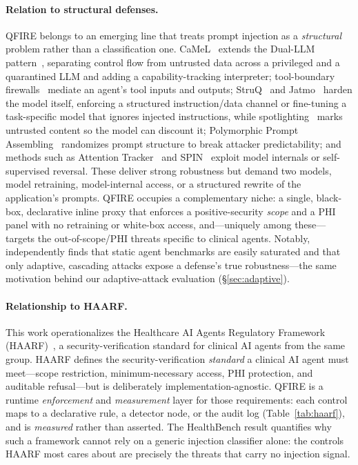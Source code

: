 \documentclass[11pt]{article}
\begin{document}
\paragraph{Relation to structural defenses.}
QFIRE belongs to an emerging line that treats prompt injection as a \emph{structural}
problem rather than a classification one. CaMeL~\cite{camel2025} extends the Dual-LLM
pattern~\cite{willison2023}, separating control flow from untrusted data across a
privileged and a quarantined LLM and adding a capability-tracking interpreter;
tool-boundary firewalls~\cite{firewallsbench2026} mediate an agent's tool inputs and
outputs; StruQ~\cite{struq2024} and Jatmo~\cite{jatmo2023} harden the model itself,
enforcing a structured instruction/data channel or fine-tuning a task-specific model
that ignores injected instructions, while spotlighting~\cite{spotlighting2024} marks
untrusted content so the model can discount it; Polymorphic Prompt
Assembling~\cite{ppa2025} randomizes prompt structure to break attacker
predictability; and methods such as Attention Tracker~\cite{attentiontracker2025} and
SPIN~\cite{spin2024} exploit model internals or self-supervised reversal. These deliver
strong robustness but demand two models, model retraining, model-internal access, or a
structured rewrite of the application's prompts. QFIRE occupies a complementary niche: a single,
black-box, declarative inline proxy that enforces a positive-security \emph{scope} and a
PHI panel with no retraining or white-box access, and---uniquely among these---targets
the out-of-scope/PHI threats specific to clinical agents. Notably,
\cite{firewallsbench2026} independently finds that static agent benchmarks are easily
saturated and that only adaptive, cascading attacks expose a defense's true
robustness---the same motivation behind our adaptive-attack evaluation
(\S\ref{sec:adaptive}).

\paragraph{Relationship to HAARF.}
This work operationalizes the Healthcare AI Agents Regulatory Framework
(HAARF)~\cite{schwoebel2026haarf}, a security-verification standard for clinical AI agents
from the same group. HAARF defines the security-verification \emph{standard}
a clinical AI agent must meet---scope restriction, minimum-necessary access, PHI
protection, and auditable refusal---but is deliberately implementation-agnostic.
QFIRE is a runtime \emph{enforcement} and \emph{measurement} layer for those
requirements: each control maps to a declarative rule, a detector node, or the
audit log (Table~\ref{tab:haarf}), and is \emph{measured} rather than asserted. The
HealthBench result quantifies why such a framework cannot rely on a generic
injection classifier alone: the controls HAARF most cares about are precisely the
threats that carry no injection signal.
\end{document}
